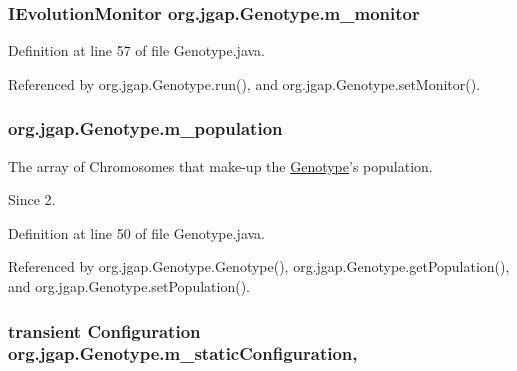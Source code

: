 \hypertarget{classorg_1_1jgap_1_1_genotype_acac1218542ab91833483ebd42ac8636b}{
\subsubsection[{m\-\_\-monitor}]{\setlength{\rightskip}{0pt plus 5cm}I\-Evolution\-Monitor org.\-jgap.\-Genotype.\-m\-\_\-monitor\hspace{0.3cm}{\ttfamily [private]}}}\label{classorg_1_1jgap_1_1_genotype_acac1218542ab91833483ebd42ac8636b}


Definition at line 57 of file Genotype.\-java.



Referenced by org.\-jgap.\-Genotype.\-run(), and org.\-jgap.\-Genotype.\-set\-Monitor().

\hypertarget{classorg_1_1jgap_1_1_genotype_aa2ba4539110aaa8d853c808679f4f0e2}{
\subsubsection[{m\-\_\-population}]{ org.\-jgap.\-Genotype.\-m\-\_\-population\hspace{0.3cm}{\ttfamily [private]}}}\label{classorg_1_1jgap_1_1_genotype_aa2ba4539110aaa8d853c808679f4f0e2}
The array of Chromosomes that make-\/up the \hyperlink{classorg_1_1jgap_1_1_genotype}{Genotype}'s population. \begin{DoxySince}{Since}
2. 
\end{DoxySince}


Definition at line 50 of file Genotype.\-java.



Referenced by org.\-jgap.\-Genotype.\-Genotype(), org.\-jgap.\-Genotype.\-get\-Population(), and org.\-jgap.\-Genotype.\-set\-Population().

\hypertarget{classorg_1_1jgap_1_1_genotype_a8b93a0b2044e40520d4a966ef3ae0bbe}{
\subsubsection[{m\-\_\-static\-Configuration}]{\setlength{\rightskip}{0pt plus 5cm}transient {\bf Configuration} org.\-jgap.\-Genotype.\-m\-\_\-static\-Configuration\hspace{0.3cm}{\ttfamily [static]}, {\ttfamily [private]}}}\label{classorg_1_1jgap_1_1_genotype_a8b93a0b2044e40520d4a966ef3ae0bbe}


